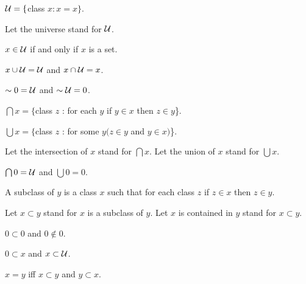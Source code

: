 \documentclass[a4paper,draft]{amsproc}
\begin{document}
\begin{forthel}
\begin{definition}[18]
$\cal{U} = \{$class $x : x = x\}$.
\end{definition}
Let the universe stand for $\cal{U}$.

\begin{theorem}[19]
$x \in \cal{U}$ if and only if $x$ is a set.
\end{theorem}

\begin{theorem}[20]
$x \cup \cal{U} = \cal{U}$ and $x \cap \cal{U} = x$.
\end{theorem}

\begin{theorem}[21]
$\sim 0 = \cal{U}$ and $\sim \cal{U} = 0$.
\end{theorem}

\begin{definition}[22]
$\bigcap x = \{$class $z$ : for each $y$ if $y \in x$ then $z \in y$\}.
\end{definition}

\begin{definition}[23]
$\bigcup x = \{$class $z$ : for some $y (z \in y$ and $y \in x)$\}.
\end{definition}

Let the intersection of $x$ stand for $\bigcap x$.
Let the union of $x$ stand for $\bigcup x$.

\begin{theorem}[24]
$\bigcap 0 = \cal{U}$ and $\bigcup 0 = 0$.
\end{theorem}

\begin{definition}[25]
A subclass of $y$ is a class $x$ such that for each class $z$ if $z \in x$ then $z \in y$.
\end{definition}

Let $x \subset y$ stand for $x$ is a subclass of $y$.
Let $x$ is contained in $y$ stand for $x \subset y$.

\begin{lemma}
$0 \subset 0$ and $0 \notin 0$.
\end{lemma}

\begin{theorem}[26]
$0 \subset x$ and $x \subset \cal{U}$.
\end{theorem}

\begin{theorem}[27]
$x = y$ iff $x \subset y$ and $y \subset x$.
\end{theorem}


\end{forthel}
\end{document}
